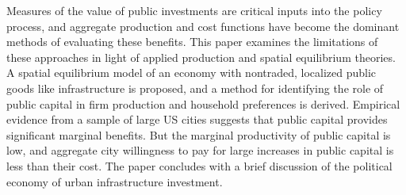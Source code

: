 Measures of the value of public investments are critical inputs into the policy process, and aggregate production and cost functions have become the dominant methods of evaluating these benefits. This paper examines the limitations of these approaches in light of applied production and spatial equilibrium theories. A spatial equilibrium model of an economy with nontraded, localized public goods like infrastructure is proposed, and a method for identifying the role of public capital in firm production and household preferences is derived. Empirical evidence from a sample of large US cities suggests that public capital provides significant marginal benefits. But the marginal productivity of public capital is low, and aggregate city willingness to pay for large increases in public capital is less than their cost. The paper concludes with a brief discussion of the political economy of urban infrastructure investment.
